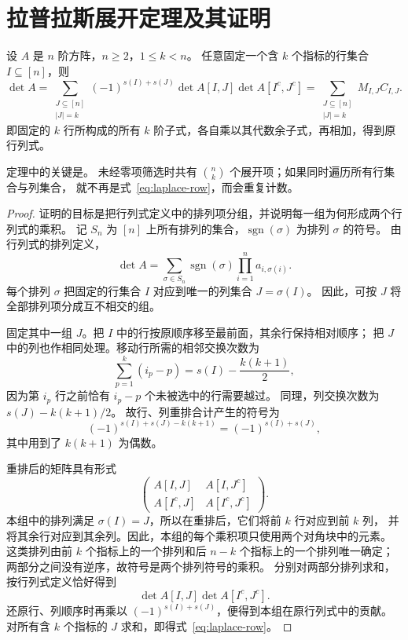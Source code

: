\documentclass[UTF8,12pt,a4paper,fontset=fandol]{ctexart}
\begin{document}
\section{拉普拉斯展开定理及其证明}

\begin{theorem}[按固定的多行展开]
\label{thm:laplace-row}
设 $A$ 是 $n$ 阶方阵，$n\geq2$，$1\leq k<n$。
任意固定一个含 $k$ 个指标的行集合 $I\subseteq[n]$，则
\begin{equation}
  \det A
  =\sum_{\substack{J\subseteq[n]\\|J|=k}}
  (-1)^{s(I)+s(J)}\det A[I,J]\det A[I^c,J^c]
  =\sum_{\substack{J\subseteq[n]\\|J|=k}}M_{I,J}C_{I,J}.
  \label{eq:laplace-row}
\end{equation}
即固定的 $k$ 行所构成的所有 $k$ 阶子式，各自乘以其代数余子式，再相加，得到原行列式。
\end{theorem}

定理中的关键是。
未经零项筛选时共有 $\binom nk$ 个展开项；如果同时遍历所有行集合与列集合，
就不再是式~\eqref{eq:laplace-row}，而会重复计数。

\begin{proof}
证明的目标是把行列式定义中的排列项分组，并说明每一组为何形成两个行列式的乘积。
记 $S_n$ 为 $[n]$ 上所有排列的集合，$\operatorname{sgn}(\sigma)$ 为排列 $\sigma$ 的符号。
由行列式的排列定义，
\[
  \det A=\sum_{\sigma\in S_n}\operatorname{sgn}(\sigma)
  \prod_{i=1}^n a_{i,\sigma(i)}.
\]
每个排列 $\sigma$ 把固定的行集合 $I$ 对应到唯一的列集合 $J=\sigma(I)$。
因此，可按 $J$ 将全部排列项分成互不相交的组。

固定其中一组 $J$。把 $I$ 中的行按原顺序移至最前面，其余行保持相对顺序；
把 $J$ 中的列也作相同处理。移动行所需的相邻交换次数为
\[
  \sum_{p=1}^k(i_p-p)=s(I)-\frac{k(k+1)}2,
\]
因为第 $i_p$ 行之前恰有 $i_p-p$ 个未被选中的行需要越过。
同理，列交换次数为 $s(J)-k(k+1)/2$。
故行、列重排合计产生的符号为
\[
  (-1)^{s(I)+s(J)-k(k+1)}=(-1)^{s(I)+s(J)},
\]
其中用到了 $k(k+1)$ 为偶数。

重排后的矩阵具有形式
\[
  \begin{pmatrix}
    A[I,J]&A[I,J^c]\\
    A[I^c,J]&A[I^c,J^c]
  \end{pmatrix}.
\]
本组中的排列满足 $\sigma(I)=J$，所以在重排后，它们将前 $k$ 行对应到前 $k$ 列，
并将其余行对应到其余列。因此，本组的每个乘积项只使用两个对角块中的元素。
这类排列由前 $k$ 个指标上的一个排列和后 $n-k$ 个指标上的一个排列唯一确定；
两部分之间没有逆序，故符号是两个排列符号的乘积。
分别对两部分排列求和，按行列式定义恰好得到
\[
  \det A[I,J]\det A[I^c,J^c].
\]
还原行、列顺序时再乘以 $(-1)^{s(I)+s(J)}$，便得到本组在原行列式中的贡献。
对所有含 $k$ 个指标的 $J$ 求和，即得式~\eqref{eq:laplace-row}。
\end{proof}
\end{document}
